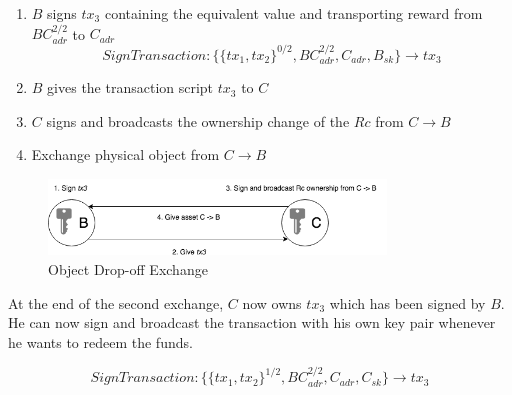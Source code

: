 \begin{enumerate}
  \item $B$ signs $tx_3$ containing the equivalent value and transporting reward from $BC_{adr}^{2/2}$ to $C_{adr}$
  \[SignTransaction \colon \{\{tx_1, tx_2\}^{0/2}, BC_{adr}^{2/2}, C_{adr}, B_{sk}\} \rightarrow tx_3\]
  \item $B$ gives the transaction script $tx_3$ to $C$
  \item $C$ signs and broadcasts the ownership change of the $Rc$ from $C\rightarrow B$
  \item Exchange physical object from $C\rightarrow B$
\end{enumerate}

\begin{figure}[h]
\centering
\includegraphics[width=0.8\textwidth]{images/exchange_02.png}
\caption{Object Drop-off Exchange}
\label{fig:3 drop-off exchange}
\end{figure}

At the end of the second exchange, $C$ now owns $tx_3$ which has been signed by $B$. He can now sign and broadcast the transaction with his own key pair whenever he wants to redeem the funds.

\[SignTransaction \colon \{\{tx_1, tx_2\}^{1/2}, BC_{adr}^{2/2}, C_{adr}, C_{sk}\} \rightarrow tx_3\]
